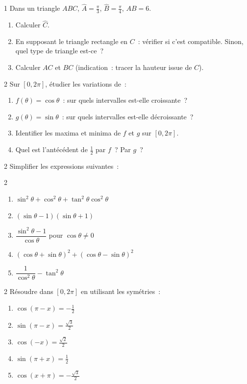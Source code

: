 \begin{exo}{1}
Dans un triangle $ABC$, $\widehat{A}=\frac{\pi}{3}$, $\widehat{B}=\frac{\pi}{4}$, $AB=6$.
\begin{enumerate}
  \item Calculer $\widehat{C}$.
  \item En supposant le triangle rectangle en $C$~: v\'erifier si c'est
        compatible. Sinon, quel type de triangle est-ce~?
  \item Calculer $AC$ et $BC$ (indication~: tracer la hauteur issue de $C$).
\end{enumerate}
\end{exo}

\begin{exo}{2}
Sur {$[0,2\pi]$}, \'etudier les variations de~:
\begin{enumerate}
  \item $f(\theta)=\cos\theta$~: sur quels intervalles est-elle croissante~?
  \item $g(\theta)=\sin\theta$~: sur quels intervalles est-elle d\'ecroissante~?
  \item Identifier les maxima et minima de $f$ et $g$ sur {$[0,2\pi]$}.
  \item Quel est l'ant\'ec\'edent de $\frac{1}{2}$ par $f$~? Par $g$~?
\end{enumerate}
\end{exo}

\begin{exo}{2}
Simplifier les expressions suivantes~:
\begin{multicols}{2}
\begin{enumerate}
  \item $\sin^2\theta+\cos^2\theta+\tan^2\theta\cos^2\theta$
  \item $(\sin\theta-1)(\sin\theta+1)$
  \item $\dfrac{\sin^2\theta-1}{\cos\theta}$ pour $\cos\theta\ne0$
  \item $(\cos\theta+\sin\theta)^2+(\cos\theta-\sin\theta)^2$
  \item $\dfrac{1}{\cos^2\theta}-\tan^2\theta$
\end{enumerate}
\end{multicols}
\end{exo}

\begin{exo}{2}
R\'esoudre dans {$[0,2\pi]$} en utilisant les sym\'etries~:
\begin{enumerate}
  \item $\cos(\pi-x) = -\frac{1}{2}$
  \item $\sin(\pi-x) = \frac{\sqrt{3}}{2}$
  \item $\cos(-x) = \frac{\sqrt{2}}{2}$
  \item $\sin(\pi+x) = \frac{1}{2}$
  \item $\cos(x+\pi) = -\frac{\sqrt{3}}{2}$
\end{enumerate}
\end{exo}

